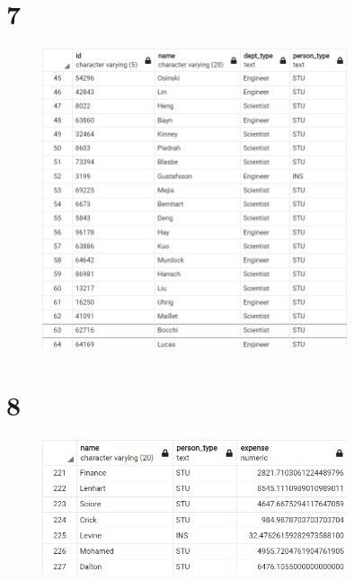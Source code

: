 \documentclass{article}
\begin{document}
\section{7}
\begin{figure}[H]
    \centering
    \includegraphics[width=0.8\textwidth]{figures/7.png}
    \caption
	{
	}
    \label{fig:fig1}
\end{figure}

\section{8}
\begin{figure}[H]
    \centering
    \includegraphics[width=0.8\textwidth]{figures/8.png}
    \caption
	{
	}
    \label{fig:fig1}
\end{figure}
\end{document}
